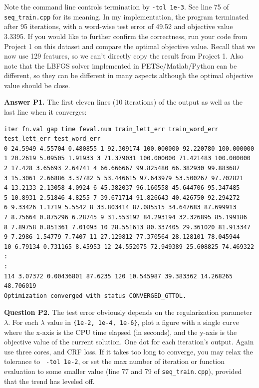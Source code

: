 \documentclass[11pt]{report}
\begin{document}
Note the command line controls termination by \verb!-tol 1e-3!.
See line 75 of \verb!seq_train.cpp! for its meaning.
In my implementation, the program terminated after 95 iterations,
with a word-wise test error of 49.52 and objective value 3.3395.
If you would like to further confirm the correctness,
run your code from Project 1 on this dataset and compare the optimal objective value.
Recall that we now use 129 features, so we can't directly copy the result from Project 1.
Also note that the LBFGS solver implemented in PETSc/Matlab/Python can be different,
so they can be different in many aspects although the optimal objective value should be close.

{\bf Answer P1.}
The first eleven lines (10 iterations) of the output as well as the last line when it converges:
\begin{verbatim}
iter fn.val gap time feval.num train_lett_err train_word_err test_lett_err test_word_err
0 24.5949 4.55704 0.480855 1 92.309174 100.000000 92.220780 100.000000
1 20.2619 5.09505 1.91933 3 71.379031 100.000000 71.421483 100.000000
2 17.428 3.65693 2.64741 4 66.666667 99.825480 66.382930 99.883687
3 15.3061 2.66886 3.37782 5 53.446615 97.643979 53.500267 97.702821
4 13.2133 2.13058 4.0924 6 45.382037 96.160558 45.644706 95.347485
5 10.8931 2.51846 4.8255 7 39.671714 91.826643 40.426750 92.294272
6 9.33426 1.1719 5.5542 8 33.803414 87.085515 34.647683 87.699913
7 8.75664 0.875296 6.28745 9 31.553192 84.293194 32.326895 85.199186
8 7.89758 0.851361 7.01093 10 28.551613 80.337405 29.361020 81.913347
9 7.2986 1.54779 7.7407 11 27.129812 77.370564 28.128101 78.045944
10 6.79134 0.731165 8.45953 12 24.552075 72.949389 25.608825 74.469322
:
:
114 3.07372 0.00436801 87.6235 120 10.545987 39.383362 14.268265 48.706019
Optimization converged with status CONVERGED_GTTOL.
\end{verbatim}

{\bf Question P2.}
The test error obviously depends on the regularization parameter $\lambda$. For each $\lambda$ value in \verb!{1e-2, 1e-4, 1e-6}!, plot a figure with a single curve where the x-axis is the CPU time elapsed (in seconds), and the y-axis is the objective value of the current solution.
One dot for each iteration's output.
Again use three cores, and CRF loss.
If it takes too long to converge,
you may relax the tolerance to \eg\ \verb!-tol 1e-2!,
or set the max number of iteration or function evaluation to some smaller value
(line 77 and 79 of \verb!seq_train.cpp!),
provided that the trend has leveled off.
\end{document}
